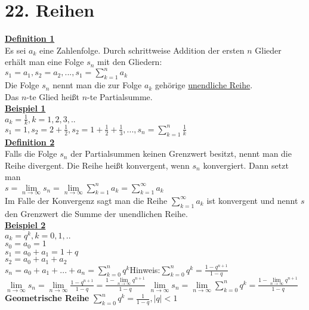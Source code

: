 \documentclass[12pt,a4paper]{article}
\renewenvironment{shaded}{%
	\def\FrameCommand{\fboxsep=\FrameSep \colorbox{shadecolor}}%
	\MakeFramed{\advance\hsize-\width \FrameRestore\FrameRestore}}%
{\endMakeFramed}
\begin{document}
\section{22. Reihen}
\underline{\textbf{Definition 1}}\\
Es sei $a_k$ eine Zahlenfolge. Durch schrittweise Addition der ersten $n$ Glieder erhält man eine Folge $s_n$ mit den Gliedern:\\
$s_1 = a_1, s_2 = a_2, ... ,s_1 = \sum\limits_{k=1}^{n}a_k$ \\
Die Folge $s_n$ nennt man die zur Folge $a_k$ gehörige \underline{unendliche Reihe}.\\
Das $n$-te Glied heißt $n$-te Partialsumme.\\
\underline{\textbf{Beispiel 1}}\\
$a_k = \frac{1}{k}, k = 1,2,3,..$\\
$s_1=1,s_2=2+\frac{1}{2},s_2=1+\frac{1}{2}+\frac{1}{3},...,s_n=\sum\limits_{k=1}^{n}\frac{1}{k}$
\\
\underline{\textbf{Definition 2}}\\
Falls die Folge $s_n$ der Partialsummen keinen Grenzwert
besitzt, nennt man die Reihe divergent.
Die Reihe heißt konvergent, wenn $s_n$ konvergiert. Dann setzt
man\\ 
$s = \lim \limits_{n \to \infty}s_n=\lim \limits_{n \to \infty}\sum\limits_{k=1}^{n}a_k=\sum\limits_{k=1}^{\infty}a_k$
\\
Im Falle der Konvergenz sagt man die Reihe $\sum\limits_{k=1}^{\infty}a_k$ ist konvergent und nennt $s$ den Grenzwert die Summe der unendlichen Reihe.
\\
\underline{\textbf{Beispiel 2}}\\
$a_k=q^k,k=0,1,..$\\
$s_0=a_0=1$\\
$s_1=a_0+a_1=1+q$\\
$s_2=a_0+a_1+a_2$\\
$s_n=a_0+a_1+...+a_n=\sum\limits_{k=0}^{n}q^k$Hinweis:$\sum\limits_{k=0}^{n}q^k=\frac{1-q^{n+1}}{1-q}$\\
$\lim \limits_{n \to \infty}s_n =\lim \limits_{n \to \infty} \frac{1-q^{n+1}}{1-q}=\frac{1-\lim \limits_{n \to \infty}q^{n+1}}{1-q}$
\begin{shaded}
	$\lim \limits_{n \to \infty}s_n =\lim \limits_{n \to \infty}\sum\limits_{k=0}^{n}q^k=\frac{1-\lim \limits_{n \to \infty}q^{n+1}}{1-q}$
\end{shaded}
\newpage
\textbf{Geometrische Reihe} $\sum\limits_{k=0}^{n}q^k =\frac{1}{1-q},|q|<1$
\\
\end{document}
